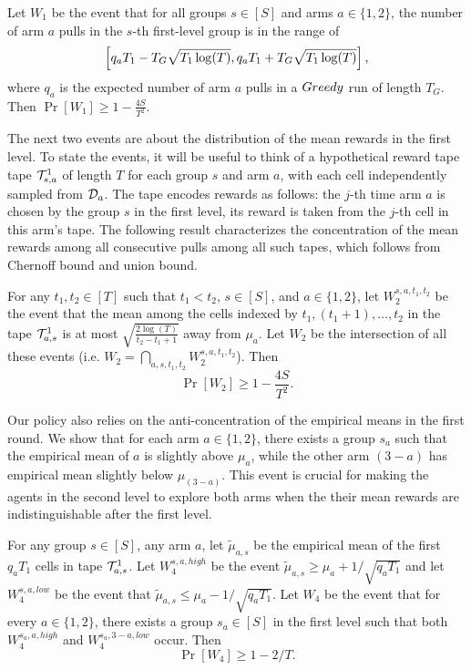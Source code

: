 \begin{lemma}\label{3levelw1}
  Let $W_1$ be the event that for all groups $s\in [S]$ and arms
  $a\in \{1, 2\}$, the number of arm $a$ pulls in the $s$-th
  first-level group is in the range of
  $$
  \left[q_a T_1- T_G \sqrt{T_1\log(T)}, q_a T_1 + T_G \sqrt{T_1\log(T)}\right],
  $$
  where $q_a$ is the expected number of arm $a$ pulls in a $Greedy$ run
  of length $T_G$. Then $\Pr[W_1] \geq 1- \frac{4S}{T^2}$.
\end{lemma}


The next two events are about the distribution of the mean rewards in
the first level. To state the events, it will be useful to think of a
hypothetical reward tape tape $\mathcal{T}^1_{s, a}$ of length $T$ for each
group $s$ and arm $a$, with each cell independently sampled from
$\mathcal{D}_a$.  The tape encodes rewards as follows: the $j$-th time arm $a$
is chosen by the group $s$ in the first level, its reward is taken
from the $j$-th cell in this arm’s tape. The following result
characterizes the concentration of the mean rewards among all
consecutive pulls among all such tapes, which follows from Chernoff
bound and union bound.

\begin{lemma}\label{3levelw2}
  For any $t_1, t_2\in [T]$ such that $t_1 < t_2$, $s\in [S]$, and
  $a\in \{1,2\}$, let $W_2^{s,a,t_1,t_2}$ be the event that the mean
  among the cells indexed by $t_1, (t_1+1), \ldots, t_2$ in the tape
  $\mathcal{T}^1_{a, s}$ is at most $\sqrt{\frac{2\log(T)}{t_2-t_1+1}}$ away
  from $\mu_a$.  Let $W_2$ be the intersection of all these events
  (i.e.  $W_2 = \bigcap_{a,s,t_1,t_2} W_2^{s,a,t_1,t_2}$). Then
  \[
    \Pr[W_2] \geq 1- \frac{4S}{T^2}.
  \]
\end{lemma}

Our policy also relies on the anti-concentration of the empirical
means in the first round. We show that for each arm $a\in \{1, 2\}$,
there exists a group $s_a$ such that the empirical mean of $a$ is
slightly above $\mu_a$, while the other arm $(3 - a)$ has empirical
mean slightly below $\mu_{(3-a)}$. This event is crucial for making
the agents in the second level to explore both arms when the their
mean rewards are indistinguishable after the first level.


\begin{lemma}\label{3levelw4}
  For any group $s\in [S]$, any arm $a$, let $\tilde\mu_{a,s}$ be the
  empirical mean of the first $q_a T_1$ cells in tape $\mathcal{T}^1_{a, s}$.
  Let $W_4^{s,a,high}$ be the event
  $\tilde\mu_{a, s} \geq \mu_a + 1/\sqrt{q_a T_1}$ and let
  $W_4^{s,a,low}$ be the event that
  $\tilde\mu_{a, s} \leq \mu_a - 1/\sqrt{q_a T_1}$.  Let $W_4$ be the
  event that for every $a\in \{1, 2\}$, there exists a group
  $s_a\in [S]$ in the first level such that both $W_4^{s_a,a,high}$
  and $W_4^{s_a,3-a,low}$ occur. Then
  \[
    \Pr[W_4]\geq 1 -2 /T.
  \]
\end{lemma}





